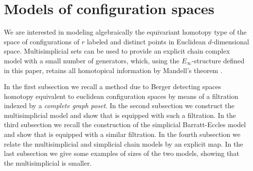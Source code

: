 
\section{Models of configuration spaces}

We are interested in modeling algebraically the equivariant homotopy type of the space of configurations of $r$ labeled and distinct points in Euclidean $d$-dimensional space.
Multisimplicial sets can be used to provide an explicit chain complex model with a small number of generators, which, using the $E_\infty$-structure defined in this paper, retains all homotopical information by Mandell's theorem \cite{mandell2006homotopy_type}.

In the first subsection we recall a method due to Berger detecting spaces homotopy equivalent to euclidean configuration spaces by means of a filtration indexed by a {\em complete graph poset}.
In the second subsection we construct the multisimplicial model and show that is equipped with such a filtration.
In the third subsection we recall the construction of the simplicial Barratt-Eccles model and show that is equipped with a similar filtration.
In the fourth subsection we relate the multisimplicial and simplicial chain models by an explicit map. In the last subsection we give some examples of sizes of the two models, showing that the multisimplicial is smaller.






